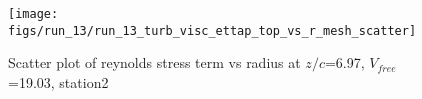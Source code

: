 \begin{figure}[H]
\centering
\texttt{[image: figs/run\_13/run\_13\_turb\_visc\_ettap\_top\_vs\_r\_mesh\_scatter]}
\caption{Scatter plot of reynolds stress term vs radius at $z/c$=6.97, $V_{free}$=19.03, station2}
\label{fig:run_13_turb_visc_ettap_top_vs_r_mesh_scatter}
\end{figure}


